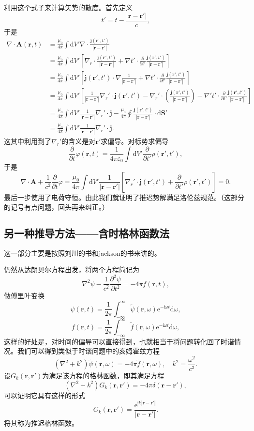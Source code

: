 \documentclass[UTF8]{ctexbook}
\newcommand{\e}{\mathrm{e}}
\renewcommand{\d}{\mathrm{d}}
\renewcommand{\b}{\boldsymbol}
\renewcommand{\i}{\mathrm{i}}
\renewcommand{\k}{\frac{1}{4\pi\varepsilon_0}}
\numberwithin{equation}{chapter}
\begin{document}
	利用这个式子来计算矢势的散度。首先定义
	\[t'=t-\frac{|\b{r}-\b{r}'|}{c},\]
	于是
	\begin{align*}
		\nabla\cdot\b{A}(\b{r},t)&=\frac{\mu_0}{4\pi}\int\d V'\nabla\cdot\frac{\b{j}(\b{r'},t')}{|\b{r}-\b{r}'|} \\
		&=\frac{\mu_0}{4\pi}\int\d V'\left[\nabla_r\cdot\frac{\b{j}(\b{r}',t')}{|\b{r}-\b{r}'|}+\nabla t'\cdot\frac{\partial }{\partial t'}\frac{\b{j}(\b{r}',t')}{|\b{r}-\b{r}'|}\right]\\
		&=\frac{\mu_0}{4\pi}\int \d V'\left[\b{j}(\b{r}',t')\cdot\nabla\frac{1}{|\b{r}-\b{r}'|}+\nabla t'\cdot\frac{\partial }{\partial t'}\frac{\b{j}(\b{r}',t')}{|\b{r}-\b{r}'|}\right]\\
		&=\frac{\mu_0}{4\pi}\int \d V'\left[\frac{1}{|\b{r}-\b{r}'|}\nabla_r'\cdot\b{j}(\b{r}',t')-\nabla_r'\cdot\left(\frac{\b{j}(\b{r}',t')}{|\b{r}-\b{r}'|}\right)-\nabla' t'\cdot\frac{\partial }{\partial t'}\frac{\b{j}(\b{r}',t')}{|\b{r}-\b{r}'|}\right]\\
		&=\frac{\mu_0}{4\pi}\int\d V'\frac{1}{|\b{r}-\b{r}'|}\nabla_r'\cdot\b{j}-\frac{\mu_0}{4\pi}\oint\frac{\b{j}(\b{r}',t')}{|\b{r}-\b{r}'|}\cdot\d \b{S}' \\
		&=\frac{\mu_0}{4\pi}\int\d V'\frac{1}{|\b{r}-\b{r}'|}\nabla_r'\cdot\b{j}.
	\end{align*}
	这其中利用到了$\nabla_r'$的含义是对$\b{r}'$求偏导。对标势求偏导
	\[\frac{\partial }{\partial t}\varphi(\b{r},t)=\k\int\d V'\frac{\partial}{\partial t'}\rho(\b{r}',t'),\]
	于是
	\[\nabla\cdot\b{A}+\frac{1}{c^2}\frac{\partial }{\partial t}\varphi=\frac{\mu_0}{4\pi}\int\d V'\frac{1}{|\b{r}-\b{r}'|}\left[\nabla_r'\cdot\b{j}(\b{r}',t')+\frac{\partial}{\partial t'}\rho(\b{r}',t')\right]=0.\]
	最后一步使用了电荷守恒。由此我们就证明了推迟势解满足洛伦兹规范。（这部分的记号有点问题，回头再来纠正。）
	
	\subsection{另一种推导方法——含时格林函数法}
	这一部分主要是按照刘川的书和jackson的书来讲的。
	
	仍然从达朗贝尔方程出发，将两个方程简记为
	\[\nabla^2 \psi -\frac{1}{c^2}\frac{\partial^2 \psi}{\partial t^2}=-4\pi f(\b{r},t),\]
	做傅里叶变换
	\[\psi(\b{r},t)=\frac{1}{2\pi}\int_{-\infty}^\infty \tilde{\psi}(\b{r},\omega)\e^{-\i\omega t}\d \omega,\]
	\[f(\b{r},t)=\frac{1}{2\pi}\int_{-\infty}^{\infty}\tilde{f}(\b{r},\omega)\e^{-\i\omega t}\d \omega,\]
	这样的好处是，对时间的偏导可以直接得到，也就相当于将问题转化回了时谐情况。我们可以得到类似于时谐问题中的亥姆霍兹方程
	\[(\nabla^2 + k^2 )\tilde{\psi}(\b{r},\omega)=-4\pi\tilde{f}(\b{r},\omega),\quad k^2=\frac{\omega^2}{c^2}.\]
	设$G_k(\b{r},\b{r}')$为满足该方程的格林函数，即其满足方程
	\[(\nabla^2+k^2)G_k(\b{r},\b{r}')=-4\pi\delta(\b{r}-\b{r}'),\]
	可以证明它具有这样的形式
	\[G_k(\b{r},\b{r}')=\frac{\e^{\i k|\b{r}-\b{r}'|}}{|\b{r}-\b{r}'|}.\]
	将其称为推迟格林函数。
	
\end{document}
